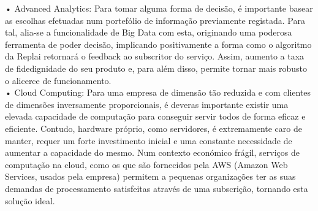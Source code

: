 •	Advanced Analytics: Para tomar alguma forma de decisão, é importante basear as escolhas efetuadas num portefólio de informação previamente registada. Para tal, alia-se a funcionalidade de Big Data com esta, originando uma poderosa ferramenta de poder decisão, implicando positivamente a forma como o algoritmo da Replai retornará o feedback ao subscritor do serviço. Assim, aumento a taxa de fidedignidade do seu produto e, para além disso, permite tornar mais robusto o alicerce de funcionamento.\\

•	Cloud Computing: Para uma empresa de dimensão tão reduzida e com clientes de dimensões inversamente proporcionais, é deveras importante existir uma elevada capacidade de computação para conseguir servir todos de forma eficaz e eficiente. Contudo, hardware próprio, como servidores, é extremamente caro de manter, requer um forte investimento inicial e uma constante necessidade de aumentar a capacidade do mesmo. Num contexto económico frágil, serviços de computação na cloud, como os que são fornecidos pela AWS (Amazon Web Services, usados pela empresa)  permitem a pequenas organizações ter as suas demandas de processamento satisfeitas através de uma subscrição, tornando esta solução ideal.